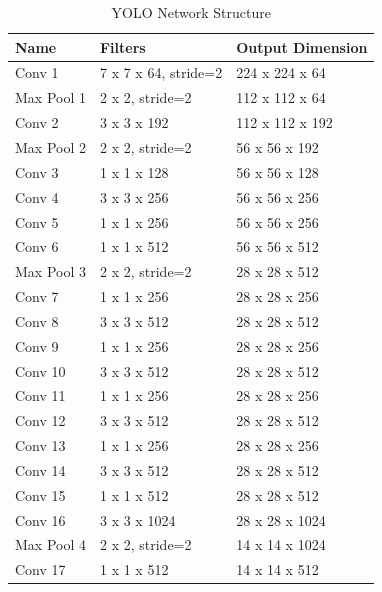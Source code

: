 \begin{table}[hbt!]
  \centering
  \caption[YOLO Network Structure]{YOLO Network Structure}
  \label{tab:orig-yolo-network}
  {\renewcommand{\arraystretch}{1.5}
    \begin{tabular}{p{} p{} p{}}
      \toprule
      Name       &        Filters         & Output Dimension  \\
      \hline
      Conv 1     & 7 x 7 x 64, stride=2   & 224 x 224 x 64    \\
      Max Pool 1 & 2 x 2, stride=2        & 112 x 112 x 64    \\
      Conv 2     & 3 x 3 x 192            & 112 x 112 x 192   \\
      Max Pool 2 & 2 x 2, stride=2        & 56 x 56 x 192     \\
      Conv 3     & 1 x 1 x 128            & 56 x 56 x 128     \\
      Conv 4     & 3 x 3 x 256            & 56 x 56 x 256     \\
      Conv 5     & 1 x 1 x 256            & 56 x 56 x 256     \\
      Conv 6     & 1 x 1 x 512            & 56 x 56 x 512     \\
      Max Pool 3 & 2 x 2, stride=2        & 28 x 28 x 512     \\
      Conv 7     & 1 x 1 x 256            & 28 x 28 x 256     \\
      Conv 8     & 3 x 3 x 512            & 28 x 28 x 512     \\
      Conv 9     & 1 x 1 x 256            & 28 x 28 x 256     \\
      Conv 10    & 3 x 3 x 512            & 28 x 28 x 512     \\
      Conv 11    & 1 x 1 x 256            & 28 x 28 x 256     \\
      Conv 12    & 3 x 3 x 512            & 28 x 28 x 512     \\
      Conv 13    & 1 x 1 x 256            & 28 x 28 x 256     \\
      Conv 14    & 3 x 3 x 512            & 28 x 28 x 512     \\
      Conv 15    & 1 x 1 x 512            & 28 x 28 x 512     \\
      Conv 16    & 3 x 3 x 1024           & 28 x 28 x 1024    \\
      Max Pool 4 & 2 x 2, stride=2        & 14 x 14 x 1024    \\
      Conv 17    & 1 x 1 x 512            & 14 x 14 x 512     \\

\end{tabular}}
\end{table}
